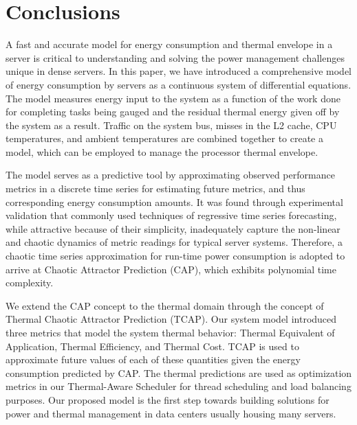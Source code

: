 \section{Conclusions}
\label{sec:conclusions}
A fast and accurate model for energy consumption and thermal envelope in
a server is critical to understanding and solving the power management
challenges unique in dense servers.  In this paper, we have introduced a
comprehensive model of energy consumption by servers as a continuous
system of differential equations.  The model measures energy input to
the system as a function of the work done for completing tasks being
gauged and the residual thermal energy given off by the system as a
result.  Traffic on the system bus, misses in the L2 cache, CPU
temperatures, and ambient temperatures are combined together to create a
model, which can be employed to manage the processor thermal envelope.

The model serves as a predictive tool by approximating observed
performance metrics in a discrete time series for estimating future
metrics, and thus corresponding energy consumption amounts.  It was
found through experimental validation that commonly used techniques of
regressive time series forecasting, while attractive because of their
simplicity, inadequately capture the non-linear and chaotic dynamics of
metric readings for typical server systems.  Therefore, a chaotic time
series approximation for run-time power consumption is adopted to arrive
at Chaotic Attractor Prediction (CAP), which exhibits polynomial time
complexity.  

We extend the CAP concept to the thermal domain through the concept of
Thermal Chaotic Attractor Prediction (TCAP). Our system model introduced
three metrics that model the system thermal behavior: Thermal Equivalent
of Application, Thermal Efficiency, and Thermal Cost.  TCAP is used to
approximate future values of each of these quantities given the energy
consumption predicted by CAP.  The thermal predictions are used as
optimization metrics in our Thermal-Aware Scheduler for thread
scheduling and load balancing purposes.  Our proposed model is the first
step towards building solutions for power and thermal management in data
centers usually housing many servers.

